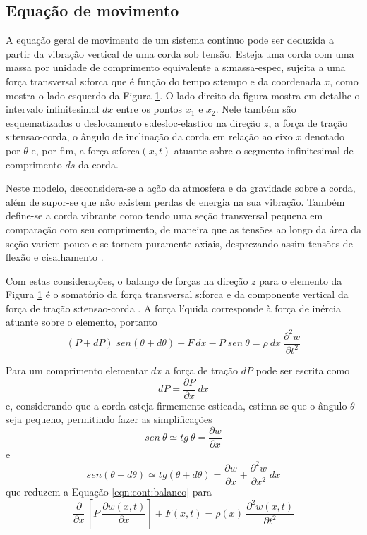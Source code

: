 \documentclass[12pt,openright,oneside,a4paper,
	chapter=TITLE,section=TITLE,
	english,brazil]{abntex2}
\begin{document}
	\subsection{Equação de movimento} \label{desenv:cont:eqn-geral}
	A equação geral de movimento de um sistema contínuo pode ser deduzida a partir da vibração vertical de uma corda sob tensão. Esteja uma corda com uma massa por unidade de comprimento equivalente a \gls{s:massa-espec}, sujeita a uma força transversal \gls{s:forca} que é função do tempo \gls{s:tempo} e da coordenada $x$, como mostra o lado esquerdo da Figura \ref{fig:vibracao-corda}. O lado direito da figura mostra em detalhe o intervalo infinitesimal $dx$ entre os pontos $x_1$ e $x_2$. Nele também são esquematizados o deslocamento \gls{s:desloc-elastico} na direção $z$, a força de tração \gls{s:tensao-corda}, o ângulo de inclinação da corda em relação ao eixo $x$ denotado por $ \theta $ e, por fim, a força \gls{s:forca}$(x,t)$ atuante sobre o segmento infinitesimal de comprimento $ds$ da corda.
	\begin{figure}[t] 
	 \label{fig:vibracao-corda}
	\end{figure}

	Neste modelo, desconsidera-se a ação da atmosfera e da gravidade sobre a corda, além de supor-se que não existem perdas de energia na sua vibração. Também define-se a corda vibrante como tendo uma seção transversal pequena em comparação com seu comprimento, de maneira que as tensões ao longo da área da seção variem pouco e se tornem puramente axiais, desprezando assim tensões de flexão e cisalhamento \cite{clark:1972}.
	
	Com estas considerações, o balanço de forças na direção $z$ para o elemento da Figura \ref{fig:vibracao-corda} é o somatório da força transversal \gls{s:forca} e da componente vertical da força de tração \gls{s:tensao-corda} \cite{rao:2008}. A força líquida corresponde à força de inércia atuante sobre o elemento, portanto
	\begin{equation} \label{eqn:cont:balanco}
		(P + dP)\;sen(\theta + d\theta) + F\:dx - P\;sen\:\theta = \rho\:dx\:\frac{\partial^2 w}{\partial t^2}
	\end{equation}
	
	Para um comprimento elementar $dx$ a força de tração $dP$ pode ser escrita como \[dP = \frac{\partial P}{\partial x}\:dx\] e, considerando que a corda esteja firmemente esticada, estima-se que o ângulo $ \theta $ seja pequeno, permitindo fazer as simplificações \[sen\:\theta \simeq tg\:\theta = \frac{\partial w}{\partial x} \] e \[sen(\theta + d\theta) \simeq tg(\theta + d\theta) = \frac{\partial w}{\partial x} + \frac{\partial^2 w}{\partial x^2}\:dx \] que reduzem a Equação \ref{eqn:cont:balanco} para \[\frac{\partial}{\partial x}\,\left[P\:\frac{\partial w(x,t)}{\partial x}\right] + F(x,t) = \rho(x)\:\frac{\partial^2 w(x,t)}{\partial t^2} \]
	
\end{document}
